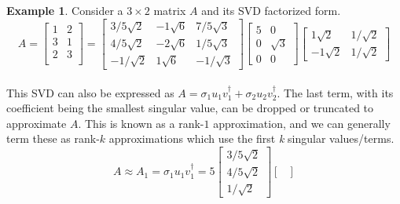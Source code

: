 \documentclass[12pt, reqno]{amsart}
\theoremstyle{definition}
\newtheorem{example}[theorem]{Example}
\theoremstyle{remark}
\numberwithin{equation}{section}
\begin{document}
\begin{example}
    Consider a $3 \times 2$ matrix $A$ and its SVD factorized form.
    \begin{equation}
        A = \begin{bmatrix}
            1 & 2\\
            3 & 1\\
            2 & 3\\
        \end{bmatrix}
        = \begin{bmatrix}
            3/5\sqrt{2} & -1\sqrt{6} & 7/5\sqrt{3}\\
            4/5\sqrt{2} & -2\sqrt{6} & 1/5\sqrt{3}\\
            -1/\sqrt{2} & 1\sqrt{6} & -1/\sqrt{3}
        \end{bmatrix}
        \begin{bmatrix}
            5 & 0\\
            0 & \sqrt{3}\\
            0 & 0
        \end{bmatrix}
        \begin{bmatrix}
            1\sqrt{2} & 1/\sqrt{2}\\
            -1\sqrt{2} & 1/\sqrt{2}
        \end{bmatrix}
    \end{equation}\\
    This SVD can also be expressed as $A = \sigma_1 u_1 v_1^\dagger + \sigma_2 u_2 v_2^\dagger$. The last term, with its coefficient being the smallest singular value, can be dropped or truncated to approximate $A$. This is known as a rank-$1$ approximation, and we can generally term these as rank-$k$ approximations which use the first \textit{k} singular values/terms.
    \begin{equation}
        A \approx A_1 = \sigma_1 u_1 v_1^\dagger = 5
        \begin{bmatrix}
            3/5\sqrt{2}\\
            4/5\sqrt{2}\\
            1/\sqrt{2}
        \end{bmatrix}
        \begin{bmatrix}

\end{bmatrix}
\end{equation}
\end{example}
\end{document}
